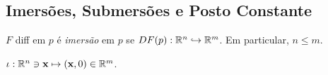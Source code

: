 \subsection*{Imersões, Submersões e Posto Constante}

\begin{definition}
    \(F\) diff em \(p\) é \emph{imersão} em \(p\) se \(DF(p): \mathbb{R}^n \hookrightarrow \mathbb{R}^m\). Em particular, \(n\leq m\).
\end{definition}
  
\begin{example} 
    \(\iota : \mathbb{R}^n \ni \textbf{x}\mapsto (\textbf{x}, 0) \in \mathbb{R}^m\). 
\end{example}



